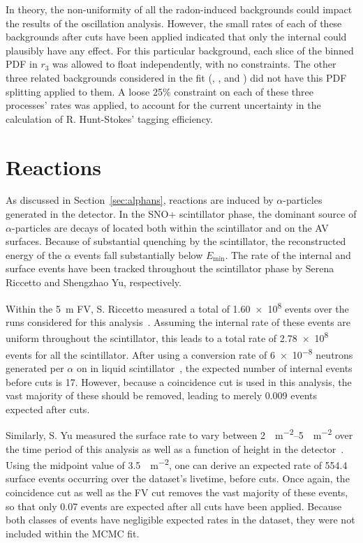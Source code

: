 In theory, the non-uniformity of all the radon-induced backgrounds could impact the results of the oscillation analysis. However, the small rates of each of these backgrounds after cuts have been applied indicated that only the internal  could plausibly have any effect. For this particular background, each slice of the binned PDF in $r_{3}$ was allowed to float independently, with no constraints. The other three related backgrounds considered in the fit (, , and ) did not have this PDF splitting applied to them. A loose 25\% constraint on each of these three processes' rates was applied, to account for the current uncertainty in the calculation of R. Hunt-Stokes' tagging efficiency.

\section[Alpha-n Reactions]{\alphan{} Reactions}
As discussed in Section~\ref{sec:alphans}, \alphan{} reactions are induced by $\alpha$-particles generated in the detector. In the SNO+ scintillator phase, the dominant source of $\alpha$-particles are decays of  located both within the scintillator and on the AV surfaces. Because of substantial quenching by the scintillator, the reconstructed energy of the  $\alpha$ events fall substantially below $E_{\textrm{min}}$. The rate of the internal and surface  events have been tracked throughout the scintillator phase by Serena Riccetto and Shengzhao Yu, respectively.

Within the \SI{5}{\m} FV, S. Riccetto measured a total of \num{1.60e8}  events over the runs considered for this analysis~\cite{riccettoPrivateCommunication2023,riccettoFullFillInternal2023}. %
Assuming the internal rate of these events are uniform throughout the scintillator, this leads to a total rate of \num{2.78e8} events for all the scintillator. After using a conversion rate of \num{6e-8} neutrons generated per $\alpha$ on  in liquid scintillator~\cite{morton-blakeFirstMeasurementReactor2021,lozzaNeutronSourcesBackgrounds2015}, %
the expected number of internal \alphan{} events before cuts is 17. However, because a coincidence cut is used in this analysis, the vast majority of these should be removed, leading to merely 0.009 events expected after cuts.

Similarly, S. Yu measured the surface  rate to vary between \SIrange{2}{5}{\Bq\per\square\metre} over the time period of this analysis as well as a function of height in the detector~\cite{yuAVSurfacePo2102023}. %
Using the midpoint value of \SI{3.5}{\Bq\per\square\metre}, one can derive an expected rate of 554.4 surface \alphan{} events occurring over the dataset's livetime, before cuts. Once again, the coincidence cut as well as the FV cut removes the vast majority of these events, so that only 0.07 events are expected after all cuts have been applied. Because both classes of \alphan{} events have negligible expected rates in the dataset, they were not included within the MCMC fit.

